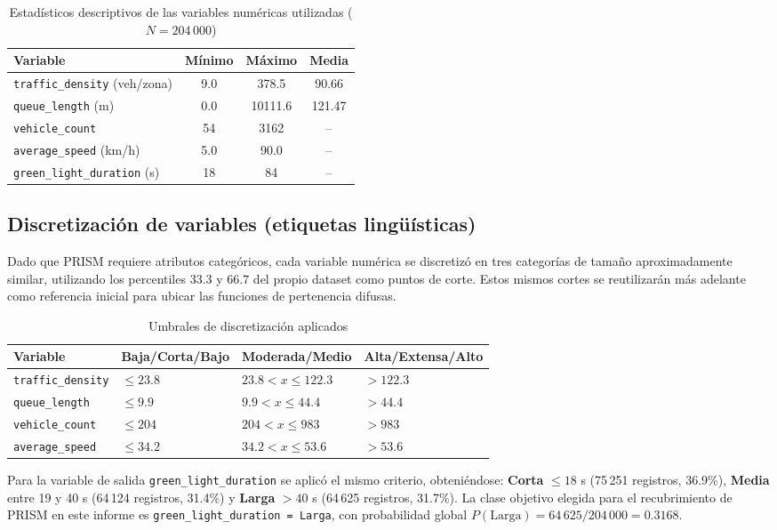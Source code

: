 \documentclass[12pt,a4paper]{article}
\begin{document}
\begin{table}[H]
\centering
\caption{Estadísticos descriptivos de las variables numéricas utilizadas ($N=204\,000$)}
\begin{tabular}{lccc}
\toprule
\textbf{Variable} & \textbf{Mínimo} & \textbf{Máximo} & \textbf{Media} \\
\midrule
\texttt{traffic\_density} (veh/zona) & 9.0 & 378.5 & 90.66 \\
\texttt{queue\_length} (m) & 0.0 & 10111.6 & 121.47 \\
\texttt{vehicle\_count} & 54 & 3162 & -- \\
\texttt{average\_speed} (km/h) & 5.0 & 90.0 & -- \\
\texttt{green\_light\_duration} (s) & 18 & 84 & -- \\
\bottomrule
\end{tabular}
\end{table}

\subsection{Discretización de variables (etiquetas lingüísticas)}

Dado que PRISM requiere atributos categóricos, cada variable numérica se
discretizó en tres categorías de tamaño aproximadamente similar,
utilizando los percentiles $33.3$ y $66.7$ del propio dataset como
puntos de corte. Estos mismos cortes se reutilizarán más adelante como
referencia inicial para ubicar las funciones de pertenencia difusas.

\begin{table}[H]
\centering
\caption{Umbrales de discretización aplicados}
\begin{tabular}{llll}
\toprule
\textbf{Variable} & \textbf{Baja/Corta/Bajo} & \textbf{Moderada/Medio} & \textbf{Alta/Extensa/Alto} \\
\midrule
\texttt{traffic\_density} & $\leq 23.8$ & $23.8 < x \leq 122.3$ & $> 122.3$ \\
\texttt{queue\_length} & $\leq 9.9$ & $9.9 < x \leq 44.4$ & $> 44.4$ \\
\texttt{vehicle\_count} & $\leq 204$ & $204 < x \leq 983$ & $> 983$ \\
\texttt{average\_speed} & $\leq 34.2$ & $34.2 < x \leq 53.6$ & $> 53.6$ \\
\bottomrule
\end{tabular}
\end{table}

Para la variable de salida \texttt{green\_light\_duration} se aplicó el
mismo criterio, obteniéndose: \textbf{Corta} $\leq 18$ s (75\,251
registros, 36.9\%), \textbf{Media} entre 19 y 40 s (64\,124 registros,
31.4\%) y \textbf{Larga} $> 40$ s (64\,625 registros, 31.7\%). La clase
objetivo elegida para el recubrimiento de PRISM en este informe es
\texttt{green\_light\_duration = Larga}, con probabilidad global
$P(\text{Larga}) = 64\,625/204\,000 = 0.3168$.
\end{document}
